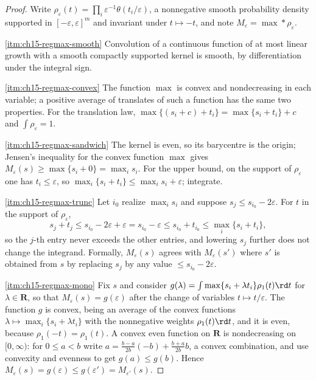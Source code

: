 \begin{proof}
Write $\rho_\varepsilon(t)=\prod_i\varepsilon^{-1}\theta(t_i/\varepsilon)$, a
nonnegative smooth probability density supported in
$[-\varepsilon,\varepsilon]^m$ and invariant under $t\mapsto-t$, and note
$M_\varepsilon=\max*\rho_\varepsilon$.

\cref{itm:ch15-regmax-smooth}
Convolution of a continuous function of at most linear growth with a smooth
compactly supported kernel is smooth, by differentiation under the integral
sign.

\cref{itm:ch15-regmax-convex}
The function $\max$ is convex and nondecreasing in each variable; a positive
average of translates of such a function has the same two properties.  For
the translation law, $\max\{(s_i+c)+t_i\}=\max\{s_i+t_i\}+c$ and
$\int\rho_\varepsilon=1$.

\cref{itm:ch15-regmax-sandwich}
The kernel is even, so its barycentre is the origin; Jensen's inequality for
the convex function $\max$ gives
$M_\varepsilon(s)\ge\max\{s_i+0\}=\max_is_i$.  For the upper bound, on the
support of $\rho_\varepsilon$ one has $t_i\le\varepsilon$, so
$\max_i\{s_i+t_i\}\le\max_is_i+\varepsilon$; integrate.

\cref{itm:ch15-regmax-trunc}
Let $i_0$ realize $\max_is_i$ and suppose
$s_j\le s_{i_0}-2\varepsilon$.  For $t$ in the support of
$\rho_\varepsilon$,
\[
 s_j+t_j\le s_{i_0}-2\varepsilon+\varepsilon
 =s_{i_0}-\varepsilon\le s_{i_0}+t_{i_0}
 \le\max_i\{s_i+t_i\},
\]
so the $j$-th entry never exceeds the other entries, and lowering $s_j$ further
does not change the integrand.  Formally, $M_\varepsilon(s)$ agrees with
$M_\varepsilon(s')$ where $s'$ is obtained from $s$ by replacing $s_j$ by any
value $\le s_{i_0}-2\varepsilon$.

\cref{itm:ch15-regmax-mono}
Fix $s$ and consider $g(\lambda)=\int\max\{s_i+\lambda t_i\}\rho_1(t)\rd t$
for $\lambda\in\mathbf R$, so that $M_\varepsilon(s)=g(\varepsilon)$ after
the change of variables $t\mapsto t/\varepsilon$.  The function $g$ is convex,
being an average of the convex functions
$\lambda\mapsto\max_i\{s_i+\lambda t_i\}$ with the nonnegative weights
$\rho_1(t)\rd t$, and it is even, because $\rho_1(-t)=\rho_1(t)$.  A convex
even function on $\mathbf R$ is nondecreasing on $[0,\infty)$: for
$0\le a<b$ write $a=\frac{b-a}{2b}(-b)+\frac{b+a}{2b}b$, a convex
combination, and use convexity and evenness to get $g(a)\le g(b)$.  Hence
$M_\varepsilon(s)=g(\varepsilon)\le g(\varepsilon')=M_{\varepsilon'}(s)$.
\end{proof}

